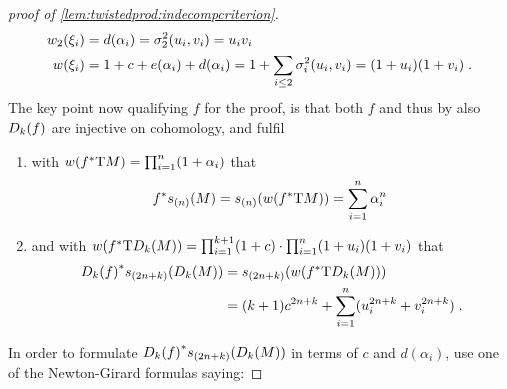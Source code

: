\begin{proof}[proof of \autoref{lem:twistedprod:indecompcriterion}]
\begin{align*}
    {w_{2}}(\xi_i) &= d(\alpha_i)   = \sigma_{2}^{2}(u_i, v_i) = u_iv_i \\
    {w}(\xi_i)  &= 1+c+e(\alpha_i)+d(\alpha_i)
                 = 1+\sum_{i\leq2}\sigma_{i}^{2}(u_i,v_i) = (1+u_i)(1+v_i)
                 \;.
  \end{align*}
  The key point now qualifying $f$ for the proof, is that both $f$ and
  thus by
  also $D_{k}({f})$ are injective on cohomology, and fulfil
  \begin{enumerate}
  \item with ${w}({f}^*\mathrm{T}M) = \prod_{i=1}^n (1+\alpha_i)$ that
    \begin{gather}\label{eq:lem:twistedprod:indecompcriterion:sM}
      {f}^* s_{(n)}(M)
      = s_{(n)}({w}({f}^*\mathrm{T}M))
      = \sum_{i=1}^n \alpha_i^n
      \;
    \end{gather}
  \item and with
    ${w}({f}^*\mathrm{T}D_{k}({M}))
    = \prod_{i=1}^{k+1}(1+c) \cdot \prod_{i=1}^n
    (1+u_i)(1+v_i)$
    that
    \begin{align}\notag
      {D_{k}({f})}^* s_{(2n+k)}(D_{k}({M}))
      &= s_{(2n+k)}({w}({f}^*\mathrm{T}D_{k}({M}))) \\
      \label{eq:lem:twistedprod:indecompcriterion:sDkM}
      &= (k+1)c^{2n+k} + \sum_{i=1}^n (u_i^{2n+k} + v_i^{2n+k})
        \;.
    \end{align}
  \end{enumerate}
  In order to formulate
  ${D_{k}({f})}^*s_{(2n+k)}(D_{k}({M}))$ 
  in terms of $c$ and $d(\alpha_i)$,
  use one of the Newton-Girard formulas saying:
\end{proof}
